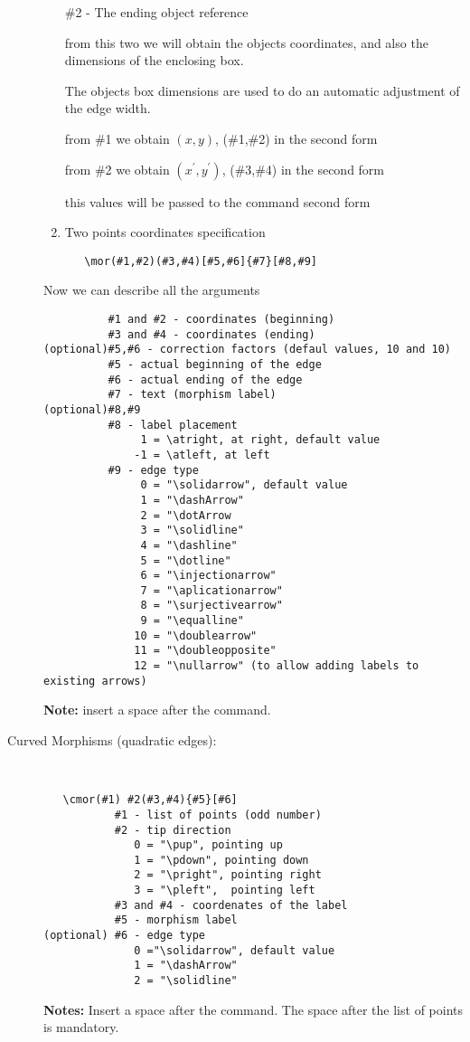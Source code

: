\documentclass[11pt]{article}
\begin{document}
\begin{description}
\begin{enumerate}
    \#2 - The ending object reference

    from this two we will obtain the objects coordinates, and also the
    dimensions of the enclosing box. 

    The objects box dimensions are used to do an automatic adjustment of
    the edge width.

    from \#1 we obtain $(x,y)$, (\#1,\#2) in the second form

    from \#2 we obtain $(x^\prime,y^\prime)$, (\#3,\#4) in the second form

    this values will be passed to the command second form

  \item Two points coordinates specification
\begin{verbatim}
   \mor(#1,#2)(#3,#4)[#5,#6]{#7}[#8,#9]
\end{verbatim}
  \end{enumerate}

  Now we can describe all the arguments
\begin{verbatim}
          #1 and #2 - coordinates (beginning)
          #3 and #4 - coordinates (ending)
(optional)#5,#6 - correction factors (defaul values, 10 and 10)
          #5 - actual beginning of the edge 
          #6 - actual ending of the edge 
          #7 - text (morphism label)
(optional)#8,#9
          #8 - label placement
               1 = \atright, at right, default value
              -1 = \atleft, at left
          #9 - edge type
               0 = "\solidarrow", default value
               1 = "\dashArrow"
               2 = "\dotArrow
               3 = "\solidline"
               4 = "\dashline"
               5 = "\dotline"
               6 = "\injectionarrow"  
               7 = "\aplicationarrow" 
               8 = "\surjectivearrow" 
               9 = "\equalline"
              10 = "\doublearrow" 
              11 = "\doubleopposite" 
              12 = "\nullarrow" (to allow adding labels to existing arrows)
\end{verbatim}

 {\bf Note:} insert a space after the command.


\item[Curved Morphisms (quadratic edges):] {\ }\\
\begin{verbatim}
   \cmor(#1) #2(#3,#4){#5}[#6]
           #1 - list of points (odd number)
           #2 - tip direction
              0 = "\pup", pointing up
              1 = "\pdown", pointing down
              2 = "\pright", pointing right
              3 = "\pleft",  pointing left
           #3 and #4 - coordenates of the label
           #5 - morphism label
(optional) #6 - edge type
              0 ="\solidarrow", default value
              1 = "\dashArrow"
              2 = "\solidline"
\end{verbatim}

 {\bf Notes:} Insert a space after the command. The space after the
 list of points is mandatory.

\end{description}
\end{document}
